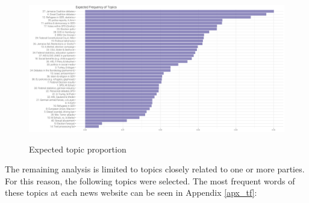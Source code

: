 \documentclass[12pt,a4paper,notitlepage]{article}
\begin{document}
\begin{figure}[H]
	\begin{center}
	\caption{Expected topic proportion}
		\includegraphics[width=\textwidth,keepaspectratio]{../figs/expected_freq.png}
		\label{fig_expected_freq}
\end{center}
\end{figure}

The remaining analysis is limited to topics closely related to one or more parties. For this reason, the following topics were selected. The most frequent words of these topics at each news website can be seen in Appendix \ref{apx_tf}: 
\end{document}
